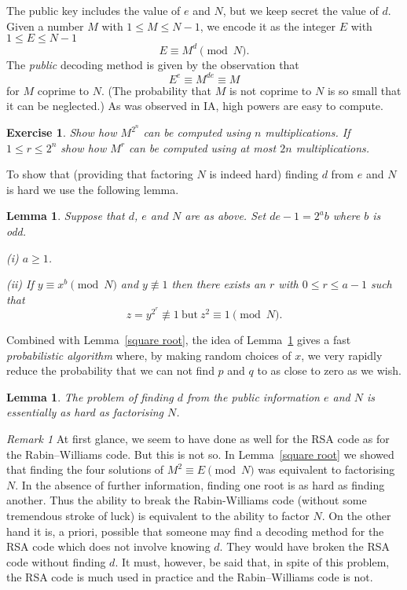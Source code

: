 \documentclass[12pt,a4paper]{article}
\theoremstyle{plain}
\newtheorem{lemma}[theorem]{Lemma}
\newtheorem{exercise}[theorem]{Exercise}
\theoremstyle{definition}
\begin{document}
The public key includes the value of $e$ and $N$,
but we keep secret the value of $d$. Given
a number $M$ with $1\leq M\leq N-1$, we encode
it as the integer $E$ with $1\leq E\leq N-1$
\[E\equiv M^{d}\pmod{N}.\]
The \emph{public} decoding method is given by the
observation that
\[E^{e}\equiv M^{de}\equiv M\]
for $M$ coprime to $N$. (The probability that
$M$ is not coprime to $N$ is so small that it
can be neglected.)
As was observed in IA, high powers are easy to compute.

\begin{exercise} Show how $M^{2^{n}}$ can be
computed using $n$ multiplications. If $1\leq r\leq 2^{n}$
show how $M^{r}$ can be computed using at most $2n$
multiplications. 
\end{exercise} 


To show that (providing that factoring $N$ is
indeed hard) finding $d$ from $e$ and $N$
is hard we use the following lemma.

\begin{lemma}\label{some root}
Suppose that $d$, $e$ and $N$ are
as above. Set $de-1=2^{a}b$ where $b$ is odd.

(i) $a\geq 1$.

(ii) If $y\equiv x^{b}\pmod{N}$ and $y\not\equiv 1$
then there exists
an $r$ with $0\leq r\leq a-1$ such that
\[z=y^{2^{r}}\not\equiv 1\ \text{but}
\ z^{2}\equiv 1\pmod{N}.\]
\end{lemma}

Combined with Lemma~\ref{square root}, the idea
of Lemma~\ref{some root} gives a fast \emph{probabilistic
algorithm} where, by making random choices of $x$,
we very rapidly reduce the probability that
we can not find $p$ and $q$ to as close to zero as we wish.
\begin{lemma}\label{L;fast probable} The problem of finding $d$
from the public information $e$ and $N$ is
essentially as hard as factorising $N$.
\end{lemma}

\emph{Remark 1} At first glance, we seem to have done as well
for the RSA code as for the Rabin--Williams code. But
this is not so. In Lemma~\ref{square root} we showed
that finding the four solutions of $M^{2}\equiv E \pmod{N}$
was equivalent to factorising $N$. In the absence
of further information, finding one root is
as hard as finding another. Thus the ability to
break the Rabin-Williams code (without some tremendous
stroke of luck) is equivalent to the ability to
factor $N$.
On the other hand it is, a priori, possible that
someone may find a decoding method
for the RSA code which does not involve knowing $d$.
They would have broken
the RSA code without finding $d$.
It must, however, be said that, in spite of this
problem, the RSA code is much used in practice
and the Rabin--Williams code is not.
\end{document}

